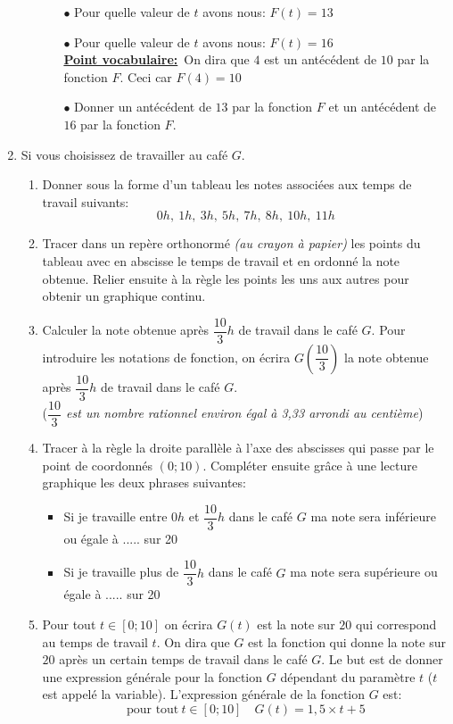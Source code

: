 \documentclass[a4paper,11pt]{article}
\theoremstyle{definition}
\begin{document}
\begin{enumerate}
\begin{enumerate}
\begin{itemize}
			\item[$\bullet$] Pour quelle valeur de $t$ avons nous: $ F(t)=13$ 
			\item[$\bullet$] Pour quelle valeur de $t$ avons nous: $ F(t)=16$ \\
			\textbf{\underline{Point vocabulaire:}}~On dira que $4$ est un antécédent de $10$ par la fonction $F$. Ceci car $F(4)=10$
			\item[$\bullet$] Donner un antécédent de $13$ par la fonction $F$ et un antécédent de $16$ par la fonction $F$.
		\end{itemize} 
		  	\end{enumerate}
		\item Si vous choisissez de travailler au café $G$.
		\begin{enumerate}
			
			\item Donner sous la forme d'un tableau les notes associées aux temps de travail suivants: $$0h,~1h,~3h,~5h,~7h,~8h,~10h,~11h$$ 
			\item Tracer dans un repère orthonormé \textit{(au crayon à papier)} les points du tableau avec en abscisse le temps de travail et en ordonné la note obtenue. Relier ensuite à la règle les points les uns aux autres pour obtenir un graphique continu. 
			\item Calculer la note obtenue après $\dfrac{10}{3}h$ de travail dans le café $G$. Pour introduire les notations de fonction, on écrira $G(\dfrac{10}{3})$ la note obtenue après $\dfrac{10}{3}h$ de travail dans le café $G$. \\(\textit{$\dfrac{10}{3}$ est un nombre rationnel environ égal à 3,33 arrondi au centième}) 
			\item Tracer à la règle la droite parallèle à l'axe des abscisses qui passe par le point de coordonnés $(0;10)$. Compléter ensuite grâce à une lecture graphique les deux phrases suivantes:
			\begin{itemize}
				\item Si je travaille entre $0h$ et $\dfrac{10}{3}h$ dans le café $G$ ma note sera inférieure ou égale à ..... sur 20
				\item Si je travaille plus de $\dfrac{10}{3}h$ dans le café $G$ ma note sera supérieure ou égale à ..... sur 20
			\end{itemize}
			\item Pour tout $t\in[0;10]$ on écrira $G(t)$ est la note sur $20$ qui correspond au temps de travail $t$. On dira que $G$ est la fonction qui donne la note sur $20$ après un certain temps de travail dans le café $G$. Le but est de donner une expression générale pour la fonction $G$ dépendant du paramètre $t$ ($t$ est appelé la variable). L'expression générale de la fonction $G$ est:
			$$\text{pour tout}~t\in[0;10]\quad G(t)=1,5\times t +5$$ 
			

\end{enumerate}
\end{enumerate}
\end{document}
